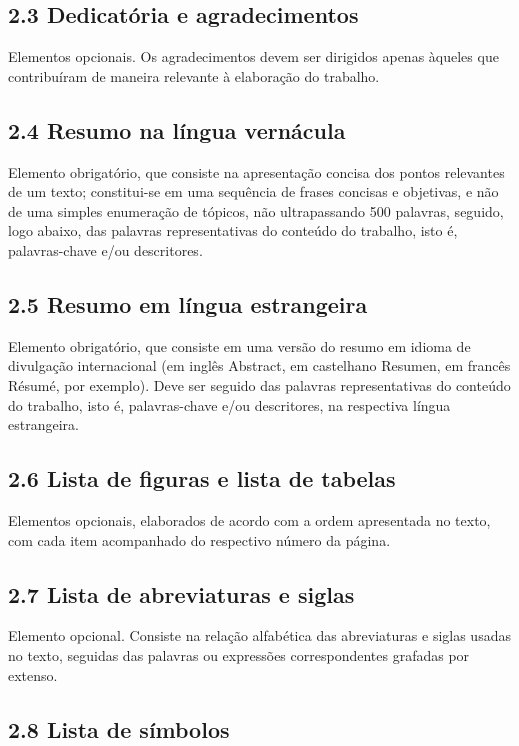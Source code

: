 \documentclass[
	12pt,				%
	oneside,			%
	a4paper,			%
	english,			%
	brazil				%
	]{abntex2ppgsi}
\begin{document}
\begin{anexosenv}
\subsection*{2.3 Dedicatória e agradecimentos}

Elementos opcionais. Os agradecimentos devem ser dirigidos apenas àqueles que contribuíram de maneira relevante à elaboração do trabalho.

\subsection*{2.4 Resumo na língua vernácula}

Elemento obrigatório, que consiste na apresentação concisa dos pontos relevantes de um texto; constitui-se em uma sequência de frases concisas e objetivas, e não de uma simples enumeração de tópicos, não ultrapassando 500 palavras, seguido, logo abaixo, das palavras representativas do conteúdo do trabalho, isto é, palavras-chave e/ou descritores.

\subsection*{2.5 Resumo em língua estrangeira}

Elemento obrigatório, que consiste em uma versão do resumo em idioma de divulgação internacional (em inglês Abstract, em castelhano Resumen, em francês Résumé, por exemplo). Deve ser seguido das palavras representativas do conteúdo do trabalho, isto é, palavras-chave e/ou descritores, na respectiva língua estrangeira.

\subsection*{2.6 Lista de figuras e lista de tabelas}

Elementos opcionais, elaborados de acordo com a ordem apresentada no texto, com cada item acompanhado do respectivo número da página.

\subsection*{2.7 Lista de abreviaturas e siglas}

Elemento opcional. Consiste na relação alfabética das abreviaturas e siglas usadas no texto, seguidas das palavras ou expressões correspondentes grafadas por extenso.

\subsection*{2.8 Lista de símbolos}


\end{anexosenv}
\end{document}
